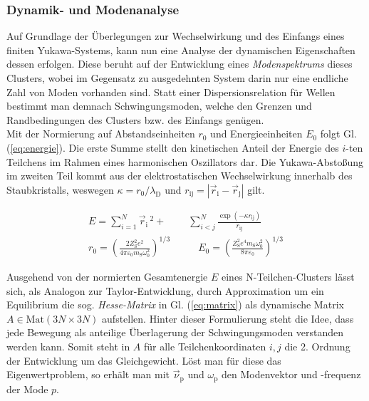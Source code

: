 \documentclass[numbers=noenddot,a4paper]{scrartcl}
\newcommand{\ix}[1]{_\text{#1}}
\newcommand{\tilt}[1]{\textit{#1}}
\begin{document}
				\subsubsection{Dynamik- und Modenanalyse} \label{subsub:moden}

					Auf Grundlage der Überlegungen zur Wechselwirkung und des Einfangs eines finiten Yukawa-Systems, kann nun eine Analyse der dynamischen Eigenschaften dessen erfolgen. Diese beruht auf der Entwicklung eines \tilt{Modenspektrums} dieses Clusters, wobei im Gegensatz zu ausgedehnten System darin nur eine endliche Zahl von Moden vorhanden sind. Statt einer Dispersionsrelation für Wellen bestimmt man demnach Schwingungsmoden, welche den Grenzen und Randbedingungen des Clusters bzw. des Einfangs genügen.\\
					Mit der Normierung auf Abstandseinheiten $r\ix{0}$ und Energieeinheiten $E\ix{0}$ folgt Gl. (\ref{eq:energie}). Die erste Summe stellt den kinetischen Anteil der Energie des $i$-ten Teilchens im Rahmen eines harmonischen Oszillators dar. Die Yukawa-Abstoßung im zweiten Teil kommt aus der elektrostatischen Wechselwirkung innerhalb des Staubkristalls, weswegen $\kappa=r\ix{0}/\lambda\ix{D}$ und $r\ix{ij}=|\vec{r}\ix{i}-\vec{r}\ix{j}|$ gilt.

						\begin{align}
							E=\sum_{i=1}^{N}\vec{r}\ix{i}\,^2+&\sum_{i<j}^{N}\frac{\exp\left(-\kappa r\ix{ij}\right)}{r\ix{ij}} \label{eq:energie} \\
							r\ix{0}=\left(\frac{2Z\ix{S}^2e^2}{4\pi\varepsilon\ix{0}m\ix{S}\omega\ix{0}^2}\right)^{1/3} \quad &\quad E\ix{0}=\left(\frac{Z\ix{S}^2e^4m\ix{S}\omega\ix{0}^2}{8\pi\varepsilon\ix{0}}\right)^{1/3} \nonumber
						\end{align}

					Ausgehend von der normierten Gesamtenergie $E$ eines N-Teilchen-Clusters lässt sich, als Analogon zur Taylor-Entwicklung, durch Approximation um ein Equilibrium die sog. \tilt{Hesse-Matrix} in Gl. (\ref{eq:matrix}) als dynamische Matrix $A\in\text{Mat}\left(3N\times3N\right)$ aufstellen. Hinter dieser Formulierung steht die Idee, dass jede Bewegung als anteilige Überlagerung der Schwingungsmoden verstanden werden kann. Somit steht in $A$ für alle Teilchenkoordinaten $i,j$ die 2. Ordnung der Entwicklung um das Gleichgewicht. Löst man für diese das Eigenwertproblem, so erhält man mit $\vec{\nu}\ix{p}$ und $\omega\ix{p}$ den Modenvektor und -frequenz der Mode $p$.
\end{document}
